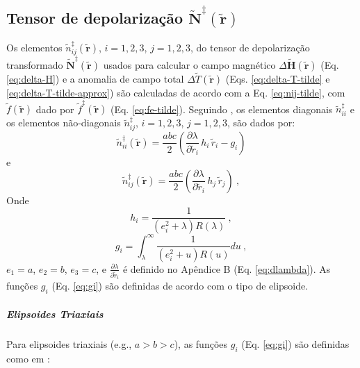 \subsection{Tensor de depolarização $\tilde{\mathbf{N}}^{\ddagger}(\tilde{\mathbf{r}})$}

Os elementos $\tilde{n}^{\ddagger}_{ij}(\tilde{\mathbf{r}})$,
$i = 1, 2, 3$, $j = 1, 2, 3$, do tensor de depolarização transformado 
$\tilde{\mathbf{N}}^{\ddagger}(\tilde{\mathbf{r}})$ usados para calcular
o campo magnético $\Delta \tilde{\mathbf{H}}(\tilde{\mathbf{r}})$ 
(Eq. \ref{eq:delta-H}) e
a anomalia de campo total $\Delta \tilde{T}(\tilde{\mathbf{r}})$
(Eqs. \ref{eq:delta-T-tilde} e \ref{eq:delta-T-tilde-approx}) 
são calculadas de acordo com a Eq. \ref{eq:nij-tilde}, com 
$\tilde{f}(\tilde{\mathbf{r}})$ dado por $\tilde{f}^{\ddagger}(\tilde{\mathbf{r}})$
(Eq. \ref{eq:fe-tilde}).
Seguindo \citet{clark1986}, os elementos diagonais $\tilde{n}^{\ddagger}_{ii}$
e os elementos não-diagonais $\tilde{n}^{\ddagger}_{ij}$, $i = 1, 2, 3$,
$j = 1, 2, 3$, são dados por:
\begin{equation}
\tilde{n}^{\ddagger}_{ii}(\tilde{\mathbf{r}}) =
\frac{abc}{2}
\left( \frac{\partial \lambda}{\partial \tilde{r}_{i}} \, h_{i} \, \tilde{r}_{i}
- g_{i} \right)
\label{eq:n-tilde-ddagger-ii}
\end{equation}
e
\begin{equation}
\tilde{n}^{\ddagger}_{ij}(\tilde{\mathbf{r}}) =
\frac{abc}{2} \left(
\frac{\partial \lambda}{\partial \tilde{r}_{i}} \, h_{j} \, \tilde{r}_{j} 
\right) \: ,
\label{eq:n-tilde-dagger-ij}
\end{equation}
Onde
\begin{equation}
h_{i} = \frac{1}{\left( e_{i}^{2} + \lambda \right) R(\lambda)} \: ,
\label{eq:hi}
\end{equation}
\begin{equation}
g_{i} = \int_{\lambda}^{\infty} \frac{1}{\left( e_{i}^{2} + u \right) R(u)} du \: ,
\label{eq:gi}
\end{equation}
$e_{1} = a$, $e_{2} = b$, $e_{3} = c$, e 
$\frac{\partial \lambda}{\partial \tilde{r}_{i}}$
é definido no Apêndice B (Eq. \ref{eq:dlambda}).
As funções $g_{i}$ (Eq. \ref{eq:gi}) são definidas de acordo com
o tipo de elipsoide.

\subparagraph*{Elipsoides Triaxiais}

Para elipsoides triaxiais  (e.g., $a > b > c$), as funções
$g_{i}$ (Eq. \ref{eq:gi}) são definidas como em
\citep{clark1986}:

